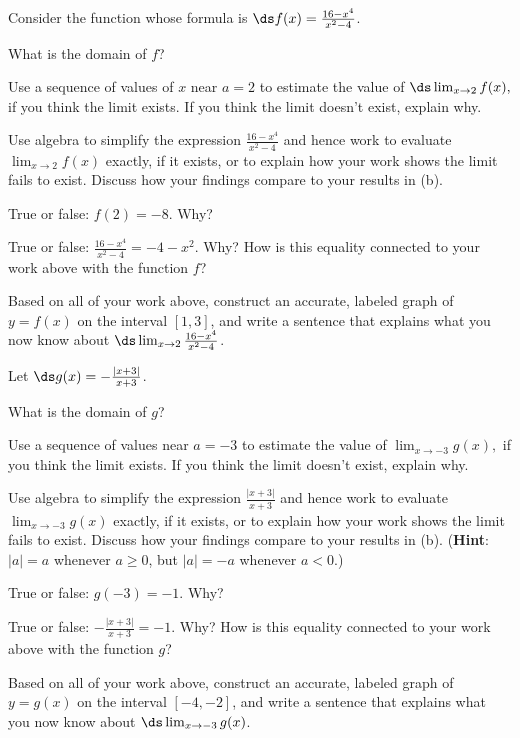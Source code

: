 \begin{exercises} 
\item Consider the function whose formula is $\ds f(x) = \frac{16-x^4}{x^2-4}$.
  \ba
  	\item What is the domain of $f$?
	\item Use a sequence of values of $x$ near $a = 2$ to estimate the value of $\ds \lim_{x \to 2} f(x),$
	if you think the limit exists.  If you think the limit doesn't exist, explain why.
	\item Use algebra to simplify the expression $\frac{16-x^4}{x^2-4}$ and hence work to evaluate $\lim_{x \to 2} f(x)$ exactly, if it exists, or to explain how your work shows the limit fails to exist.  Discuss how your findings compare to your results in (b).
	\item True or false: $f(2) = -8$.  Why?
	\item True or false: $\frac{16-x^4}{x^2-4} = -4-x^2.$  Why?  How is this equality connected to your work above with the function $f$?
	\item Based on all of your work above, construct an accurate, labeled graph of $y = f(x)$ on the interval $[1,3]$, and write a sentence that explains what you now know about $\ds \lim_{x \to 2} \frac{16-x^4}{x^2-4}$.
  \ea
 
\begin{exerciseSolution}
\end{exerciseSolution}
\item  Let $\ds g(x) = -\frac{|x+3|}{x+3}$.
  \ba
  	\item What is the domain of $g$?
	\item Use a sequence of values near $a = -3$ to estimate the value of
	$\lim_{x \to -3} g(x),$
	if you think the limit exists.  If you think the limit doesn't exist, explain why. 
	\item Use algebra to simplify the expression $\frac{|x+3|}{x+3}$ and hence work to evaluate $\lim_{x \to -3} g(x)$ exactly, if it exists, or to explain how your work shows the limit fails to exist.  Discuss how your findings compare to your results in (b).  ({\bf Hint}: $|a| = a$ whenever $a \ge 0$, but $|a| = -a$ whenever $a < 0$.)
	\item True or false: $g(-3) = -1$.  Why?
	\item True or false: $-\frac{|x+3|}{x+3} = -1.$  Why?  How is this equality connected to your work above with the function $g$?
	\item Based on all of your work above, construct an accurate, labeled graph of $y = g(x)$ on the interval $[-4,-2]$, and write a sentence that explains what you now know about $\ds \lim_{x \to -3} g(x)$.
  \ea



\end{exercises}
